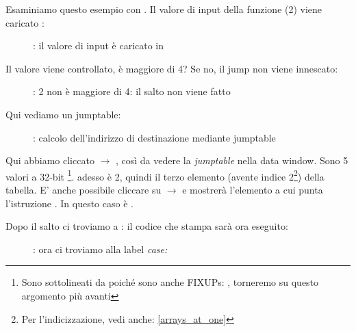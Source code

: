\clearpage
\mysubparagraph{\olly}
\myindex{\olly}

Esaminiamo questo esempio con \olly.
Il valore di input della funzione (2) viene caricato \EAX: 

\begin{figure}[H]
\centering
{}
\caption{\olly: il valore di input è caricato in \EAX}
\label{fig:switch_lot_olly1}
\end{figure}

\clearpage
Il valore viene controllato, è maggiore di 4?
Se no, il  jump non viene innescato:
\begin{figure}[H]
\centering
{}
\caption{\olly: 2 non è maggiore di 4: il salto non viene fatto}
\label{fig:switch_lot_olly2}
\end{figure}

\clearpage
Qui vediamo un jumptable:

\begin{figure}[H]
\centering
{}
\caption{\olly: calcolo dell'indirizzo di destinazione mediante jumptable}
\label{fig:switch_lot_olly3}
\end{figure}

Qui abbiamo cliccato  $\rightarrow$ , così da vedere la \emph{jumptable} nella data window.
Sono 5 valori a 32-bit \footnote{Sono sottolineati da \olly poiché
sono anche FIXUPs: , torneremo su questo argomento più avanti}.
\ECX adesso è 2, quindi il terzo elemento (avente indice 2\footnote{Per l'indicizzazione, vedi anche: \ref{arrays_at_one}}) della tabella.
E' anche possibile cliccare su  $\rightarrow$ 
 e \olly mostrerà l'elemento a cui punta l'istruzione \JMP. 
In questo caso è .

\clearpage
Dopo il salto ci troviamo a : il codice che stampa  sarà ora eseguito:

\begin{figure}[H]
\centering
{}
\caption{\olly: ora ci troviamo alla label \emph{case:}}
\label{fig:switch_lot_olly4}
\end{figure}
